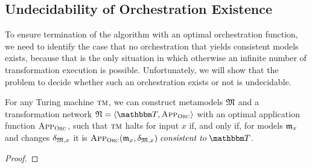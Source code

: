 





\subsection{Undecidability of Orchestration Existence} %

To ensure termination of the  algorithm with an optimal orchestration function, we need to identify the case that no orchestration that yields consistent models exists, because that is the only situation in which otherwise an infinite number of transformation execution is possible.
Unfortunately, we will show that the problem to decide whether such an orchestration exists or not is undecidable.


\begin{lemma}
    \label{lemma:networkfromturingmachine}
    For any Turing machine $\textsc{tm}$, we can construct metamodels $\mathfrak{M}$ and a transformation network $\transformationnetwork{N} = \tupled{\transformationset{T}, \appfunction{\orcfunction{}}}$ with an optimal application function $\textsc{App}_{\textsc{Orc}_{}}$, such that $\textsc{tm}$ halts for input $x$ if, and only if, for models $\mathfrak{m}_{x}$ and changes $\mathfrak{\delta}_{\mathfrak{M},x}$ it is $\appfunction{\orcfunction{}}(\modeltuple{m}_{x}, \changetuple{\metamodeltuple{M},x}) \consistenttomath \transformationset{T}$.
\end{lemma}
\begin{proof}
\end{proof}


